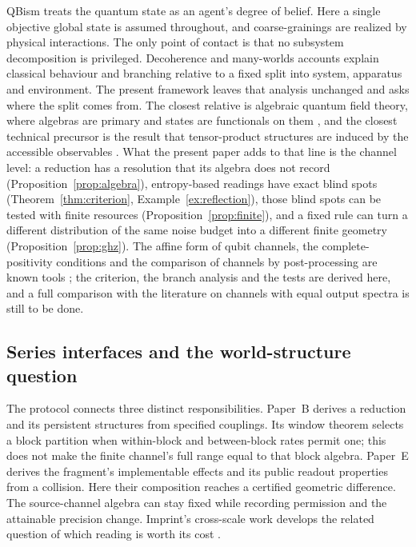 \documentclass[12pt,a4paper]{article}
\begin{document}
QBism treats the quantum state as an agent's degree of belief. Here a single objective global state is assumed throughout, and coarse-grainings are realized by physical interactions. The only point of contact is that no subsystem decomposition is privileged. Decoherence and many-worlds accounts explain classical behaviour and branching relative to a fixed split into system, apparatus and environment. The present framework leaves that analysis unchanged and asks where the split comes from. The closest relative is algebraic quantum field theory, where algebras are primary and states are functionals on them \cite{Haag1996}, and the closest technical precursor is the result that tensor-product structures are induced by the accessible observables \cite{Zanardi2004}. What the present paper adds to that line is the channel level: a reduction has a resolution that its algebra does not record (Proposition~\ref{prop:algebra}), entropy-based readings have exact blind spots (Theorem~\ref{thm:criterion}, Example~\ref{ex:reflection}), those blind spots can be tested with finite resources (Proposition~\ref{prop:finite}), and a fixed rule can turn a different distribution of the same noise budget into a different finite geometry (Proposition~\ref{prop:ghz}). The affine form of qubit channels, the complete-positivity conditions and the comparison of channels by post-processing are known tools \cite{RuskaiSzarekWerner2002,FujiwaraAlgoet1999,Jencova2015}; the criterion, the branch analysis and the tests are derived here, and a full comparison with the literature on channels with equal output spectra is still to be done.

\subsection{Series interfaces and the world-structure question}

The protocol connects three distinct responsibilities.
Paper~B derives a reduction and its persistent structures from
specified couplings. Its window theorem selects a block partition
when within-block and between-block rates permit one; this does not
make the finite channel's full range equal to that block algebra.
Paper~E derives the fragment's implementable effects and its public
readout properties from a collision. Here their composition reaches
a certified geometric difference. The source-channel algebra can
stay fixed while recording permission and the attainable precision
change. Imprint's cross-scale work develops the related question of
which reading is worth its cost \cite{LiuImprintRG}.
\end{document}

